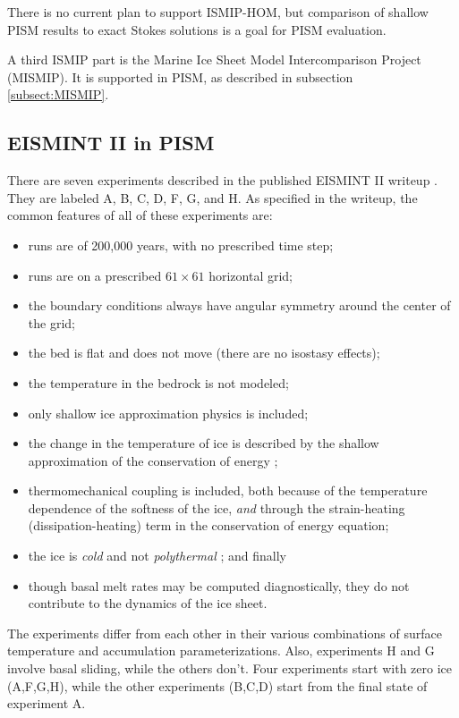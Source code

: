 \documentclass[11pt,final]{amsart}
\begin{document}
There is no current plan to support ISMIP-HOM, but comparison of shallow PISM results to exact Stokes solutions is a goal for PISM evaluation.

A third ISMIP part is the Marine Ice Sheet Model Intercomparison Project (MISMIP).  It is supported in PISM, as described in subsection \ref{subsect:MISMIP}.


\subsection{EISMINT II in PISM}\label{subsect:EISMINTII}  There are seven experiments described in the published EISMINT II writeup \cite{EISMINT00}.  They are labeled A, B, C, D, F, G, and H.  As specified in the writeup, the common features of all of these experiments are:\begin{itemize}
\item runs are of 200,000 years, with no prescribed time step;
\item runs are on a prescribed $61\times 61$ horizontal grid;
\item the boundary conditions always have angular symmetry around the center of the grid;
\item the bed is flat and does not move (there are no isostasy effects);
\item the temperature in the bedrock is not modeled;
\item only shallow ice approximation physics is included;
\item the change in the temperature of ice is described by the shallow approximation of the conservation of energy \cite{Fowler};
\item thermomechanical coupling is included, both because of the temperature dependence of the softness of the ice, \emph{and} through the strain-heating (dissipation-heating) term in the conservation of energy equation;
\item the ice is \emph{cold} and not \emph{polythermal} \cite{Greve}; and finally
\item though basal melt rates may be computed diagnostically, they do not contribute to the dynamics of the ice sheet.
\end{itemize}
The experiments differ from each other in their various combinations of surface temperature and accumulation parameterizations.  Also, experiments H and G involve basal sliding, while the others don't.  Four experiments start with zero ice (A,F,G,H), while the other experiments (B,C,D) start from the final state of experiment A.
\end{document}
